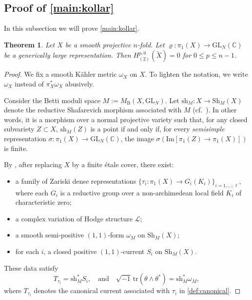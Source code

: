 \documentclass[11pt,a4paper,english]{smfart}
\theoremstyle{plain}
\newtheorem{theorem}{Theorem}[section]
\theoremstyle{definition}
\theoremstyle{plain}
\newcommand\GL{\mathrm{GL}}
\def\bC{\mathbb{C}}
\def\cL{\mathcal{L}}
\begin{document}
	
	 
 
	
	 


\subsection{Proof of \cref{main:kollar}}\label{subsec:linear}
In this subsection we will prove \cref{main:kollar}. 
\begin{theorem} \label{thm:main2}
	Let $X$ be a smooth projective $n$-fold. Let $\varrho:\pi_1(X)\to \GL_N(\bC)$ be a generically large  representation.  Then
  $H^{p,0}_{(2)}(\widetilde{X})=0$   for  $0\leq p\leq n-1$.
\end{theorem}
\begin{proof}
	We fix a smooth K\"ahler metric $\omega_X$ on $X$. To lighten the notation, we write  $\omega_X$   instead of   $\pi_X^*\omega_X$ abusively.  
	
	
	 Consider the Betti moduli space \( M := M_{\mathrm{B}}(X, \GL_N)\). Let 
$
	\mathrm{sh}_M : X \to \mathrm{Sh}_M(X)
$ 
	denote the reductive Shafarevich morphism associated with \( M \) (cf.\ \cite{Eys04, DY23}). In other words, it is a morphism over a normal projective variety such that, for any closed subvariety \( Z \subset X \),  \( \mathrm{sh}_M(Z) \) is a point if and only if, for every \emph{semisimple} representation \( \sigma: \pi_1(X) \to \mathrm{GL}_N(\mathbb{C}) \), the image \( \sigma(\mathrm{Im}[\pi_1(Z) \to \pi_1(X)]) \) is finite.
	
	By \cite[Proof of Theorem 3.29]{DY23}, after replacing \( X \) by a finite étale cover, there exist:
	\begin{itemize}
		\item a family of Zariski dense representations \( \{\tau_i : \pi_1(X) \to G_i(K_i)\}_{i=1,\ldots, \ell} \), where each \( G_i \) is a reductive group over a non-archimedean local field \( K_i \) of characteristic zero;
		\item a complex variation of Hodge structure \( \cL \);
		\item a smooth semi-positive \( (1,1) \)-form \( \omega_M \) on \( \mathrm{Sh}_M(X) \);
		\item for each \( i \), a closed positive \( (1,1) \)-current \( S_i \) on \( \mathrm{Sh}_M(X) \).
	\end{itemize}
	These data satisfy
	\[
	T_{\tau_i} = \mathrm{sh}_M^* S_i, \quad \text{and} \quad \sqrt{-1} \, \mathrm{tr}(\theta \wedge \theta^*) = \mathrm{sh}_M^* \omega_M,
	\]
	where \( T_{\tau_i} \) denotes the canonical current associated with \( \tau_i \) in \cref{def:canonical}. 


\end{proof}
\end{document}
